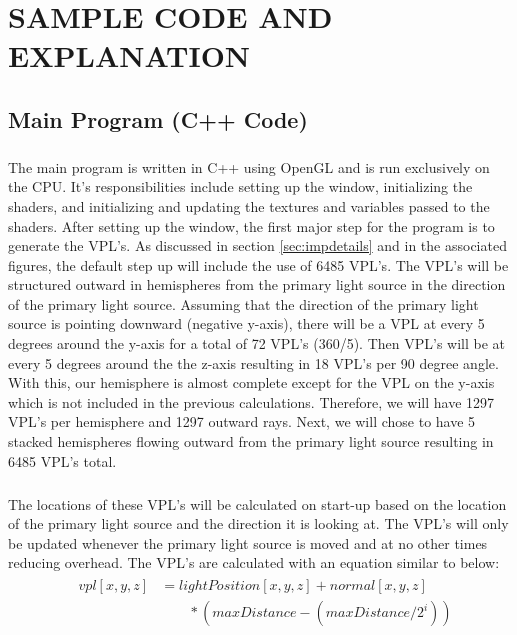 \chapter{SAMPLE CODE AND EXPLANATION}

\section{Main Program (C++ Code)}
\paragraph{}
The main program is written in C++ using OpenGL and is run exclusively on the CPU.  It's responsibilities include setting up the window, initializing the shaders, and initializing and updating the textures and variables passed to the shaders.  After setting up the window, the first major step for the program is to generate the VPL's.  As discussed in section \ref{sec:impdetails} and in the associated figures, the default step up will include the use of 6485 VPL's.  The VPL's will be structured outward in hemispheres from the primary light source in the direction of the primary light source.  Assuming that the direction of the primary light source is pointing downward (negative y-axis), there will be a VPL at every 5 degrees around the y-axis for a total of 72 VPL's (360/5).  Then VPL's will be at every 5 degrees around the the z-axis resulting in 18 VPL's per 90 degree angle.  With this, our hemisphere is almost complete except for the VPL on the y-axis which is not included in the previous calculations. Therefore, we will have 1297 VPL's per hemisphere and 1297 outward rays.  Next, we will chose to have 5 stacked hemispheres flowing outward from the primary light source resulting in 6485 VPL's total.  

\paragraph{}
The locations of these VPL's will be calculated on start-up based on the location of the primary light source and the direction it is looking at.  The VPL's will only be updated whenever the primary light source is moved and at no other times reducing overhead.  The VPL's are calculated with an equation similar to below:
\begin{align}
  &\begin{aligned} \label{eqn:vplPosition}
    vpl[x,y,z] &= lightPosition[x,y,z] + normal[x,y,z]\\
      &\qquad *(maxDistance - (maxDistance/2^i))
  \end{aligned}
\end{align}

